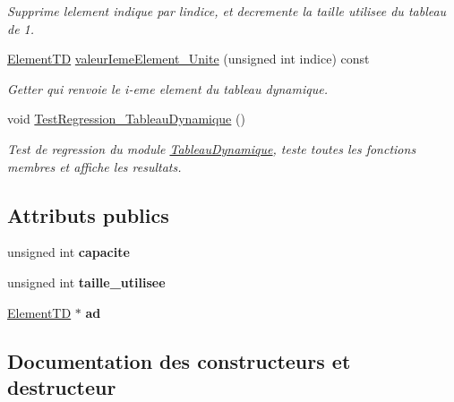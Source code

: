 \begin{DoxyCompactItemize}
\begin{DoxyCompactList}\small\item\em Supprime l\textquotesingle{}element indique par l\textquotesingle{}indice, et decremente la taille utilisee du tableau de 1. \end{DoxyCompactList}\item 
\hyperlink{classUnite}{Element\+TD} \hyperlink{classTableauDynamique_aaa3ea9b37c373c8d592ea2a7ac9d60ab}{valeur\+Ieme\+Element\+\_\+\+Unite} (unsigned int indice) const
\begin{DoxyCompactList}\small\item\em Getter qui renvoie le i-\/eme element du tableau dynamique. \end{DoxyCompactList}\item 
void \hyperlink{classTableauDynamique_a3875d8153fe023d3283709b9091d7a36}{Test\+Regression\+\_\+\+Tableau\+Dynamique} ()
\begin{DoxyCompactList}\small\item\em Test de regression du module \hyperlink{classTableauDynamique}{Tableau\+Dynamique}, teste toutes les fonctions membres et affiche les resultats. \end{DoxyCompactList}\end{DoxyCompactItemize}
\subsection*{Attributs publics}
\begin{DoxyCompactItemize}
\item 
\mbox{\label{classTableauDynamique_a7ddd455f3dc2f3d94093177025945936}} 
unsigned int {\bfseries capacite}
\item 
\mbox{\label{classTableauDynamique_ae55063c3127e7ee9390e572fb0ed3a58}} 
unsigned int {\bfseries taille\+\_\+utilisee}
\item 
\mbox{\label{classTableauDynamique_a5d63738b63b1aaabf4e1ab8a7d705032}} 
\hyperlink{classUnite}{Element\+TD} $\ast$ {\bfseries ad}
\end{DoxyCompactItemize}


\subsection{Documentation des constructeurs et destructeur}
\mbox{\label{classTableauDynamique_a9b1371952458a1b1b528dda5eff3cab4}} 
